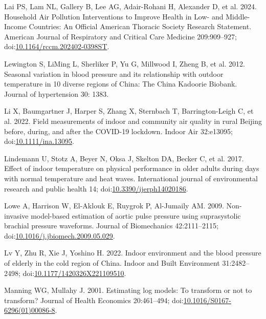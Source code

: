 \documentclass[
  letterpaper,
  DIV=11,
  numbers=noendperiod]{scrartcl}
\newlength{\cslhangindent}
\newenvironment{CSLReferences}[2] %
 {\begin{list}{}{%
  \setlength{\itemindent}{0pt}
  \setlength{\leftmargin}{0pt}
  \setlength{\parsep}{0pt}
  \ifodd #1
   \setlength{\leftmargin}{\cslhangindent}
   \setlength{\itemindent}{-1\cslhangindent}
  \fi
  \setlength{\itemsep}{#2\baselineskip}}}
 {\end{list}}
\begin{document}
\begin{CSLReferences}{1}{1}
Lai PS, Lam NL, Gallery B, Lee AG, Adair-Rohani H, Alexander D, et al.
2024. Household {Air Pollution Interventions} to {Improve Health} in
{Low-} and {Middle-Income Countries}: {An Official American Thoracic
Society Research Statement}. American Journal of Respiratory and
Critical Care Medicine 209:909--927;
doi:\href{https://doi.org/10.1164/rccm.202402-0398ST}{10.1164/rccm.202402-0398ST}.

Lewington S, LiMing L, Sherliker P, Yu G, Millwood I, Zheng B, et al.
2012. Seasonal variation in blood pressure and its relationship with
outdoor temperature in 10 diverse regions of {China}: The {China
Kadoorie Biobank}. Journal of hypertension 30: 1383.

Li X, Baumgartner J, Harper S, Zhang X, Sternbach T, Barrington-Leigh C,
et al. 2022. Field measurements of indoor and community air quality in
rural {Beijing} before, during, and after the {COVID-19} lockdown.
Indoor Air 32:e13095;
doi:\href{https://doi.org/10.1111/ina.13095}{10.1111/ina.13095}.

Lindemann U, Stotz A, Beyer N, Oksa J, Skelton DA, Becker C, et al.
2017. Effect of indoor temperature on physical performance in older
adults during days with normal temperature and heat waves. International
journal of environmental research and public health 14;
doi:\href{https://doi.org/10.3390/ijerph14020186}{10.3390/ijerph14020186}.

Lowe A, Harrison W, El-Aklouk E, Ruygrok P, Al-Jumaily AM. 2009.
Non-invasive model-based estimation of aortic pulse pressure using
suprasystolic brachial pressure waveforms. Journal of Biomechanics
42:2111--2115;
doi:\href{https://doi.org/10.1016/j.jbiomech.2009.05.029}{10.1016/j.jbiomech.2009.05.029}.

Lv Y, Zhu R, Xie J, Yoshino H. 2022. Indoor environment and the blood
pressure of elderly in the cold region of {China}. Indoor and Built
Environment 31:2482--2498;
doi:\href{https://doi.org/10.1177/1420326X221109510}{10.1177/1420326X221109510}.

Manning WG, Mullahy J. 2001. Estimating log models: To transform or not
to transform? Journal of Health Economics 20:461--494;
doi:\href{https://doi.org/10.1016/S0167-6296(01)00086-8}{10.1016/S0167-6296(01)00086-8}.


\end{CSLReferences}
\end{document}
